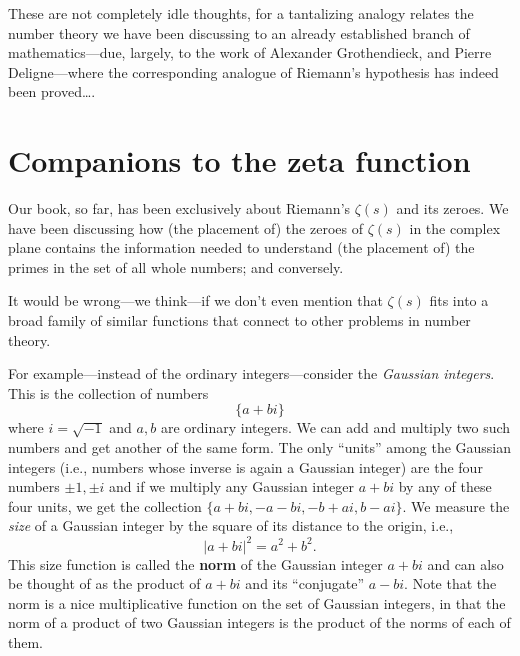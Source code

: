 \documentclass[openany]{book}
\theoremstyle{plain}
\theoremstyle{definition}
\begin{document}
{{These are not completely idle thoughts, for a tantalizing analogy
relates the number theory we have been discussing to an already
established branch of mathematics---due, largely, to the work of
Alexander Grothendieck, and Pierre Deligne---where the corresponding
analogue of Riemann's hypothesis has indeed been proved\ldots.



\chapter{Companions to the zeta function}\label{ch:companions}

Our book, so far, has been exclusively about Riemann's $\zeta(s)$ and
its zeroes. We have been discussing how (the placement of) the zeroes
of $\zeta(s)$ in the complex plane contains the information needed to
understand (the placement of) the primes in the set of all whole
numbers; and conversely.

It would be wrong---we think---if we don't even mention that
$\zeta(s)$ fits into a broad family of similar functions that connect to other problems in number theory.



For example---instead of the ordinary integers---consider the {\it
  Gaussian integers}. This is the collection of numbers
 $$ \{ a+bi\}$$
 where $i = {\sqrt{-1}}$ and $a,b$ are ordinary integers. We can add
 and multiply two such numbers and get another of the same form. The
 only ``units'' among the Gaussian integers (i.e., numbers whose
 inverse is again a Gaussian integer) are the four numbers $\pm 1, \pm
 i$ and if we multiply any Gaussian integer $a+bi$ by any of these
 four units, we get the collection $\{a+bi, -a-bi, -b+ai, b -ai\}$.
 We measure the {\it size} of a Gaussian integer by the square of its
 distance to the origin, i.e., $$|a+bi|^2 = {a^2+b^2}.$$   This size function  is called the {\bf norm} of the Gaussian integer $a+bi$ and can also be thought of as  the product of $a+bi$ and its ``conjugate'' $a-bi$.   Note that
 the norm is a nice multiplicative function on the set of Gaussian
 integers, in that the norm of a product of two Gaussian integers is
 the product of the norms of each of them.

}}
\end{document}
